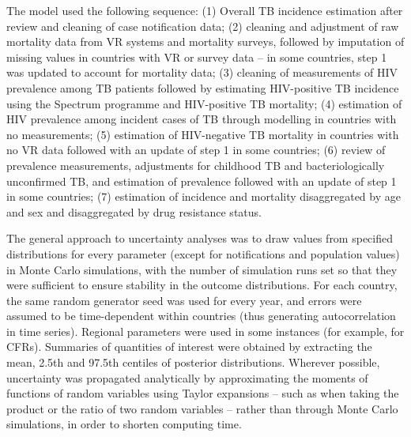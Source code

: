 The model used the following sequence: (1) Overall TB incidence estimation after review and cleaning of case notification data; (2) cleaning and adjustment of raw mortality data from VR systems and mortality surveys, followed by imputation of missing values in countries with VR or survey data – in some countries, step 1 was updated to account for mortality data; (3) cleaning of measurements of HIV prevalence among TB patients followed by estimating HIV-positive TB incidence using the Spectrum programme and HIV-positive TB mortality; (4) estimation of HIV prevalence among incident cases of TB through modelling in countries with no measurements; (5) estimation of HIV-negative TB mortality in countries with no VR data followed with an update of step 1 in some countries; (6) review of prevalence measurements, adjustments for childhood TB and bacteriologically unconfirmed TB,  and estimation of prevalence followed with an update of step 1 in some countries; (7) estimation of incidence and mortality disaggregated by age and sex and disaggregated by drug resistance status.

The general approach to uncertainty analyses was to draw values from specified distributions for every parameter (except for notifications and population values) in Monte Carlo simulations, with the number of simulation runs set so that they were sufficient to ensure stability in the outcome distributions. For each country, the same random generator seed was used for every year, and errors were assumed to be time-dependent within countries (thus generating autocorrelation in time series). Regional parameters were used in some instances (for example, for CFRs). Summaries of quantities of interest were obtained by extracting the mean, 2.5th and 97.5th centiles of posterior distributions. Wherever possible, uncertainty was propagated analytically by approximating the moments of functions of random variables using Taylor expansions – such as when taking the product or the ratio of two random variables – rather than through Monte Carlo simulations, in order to shorten computing time. 

